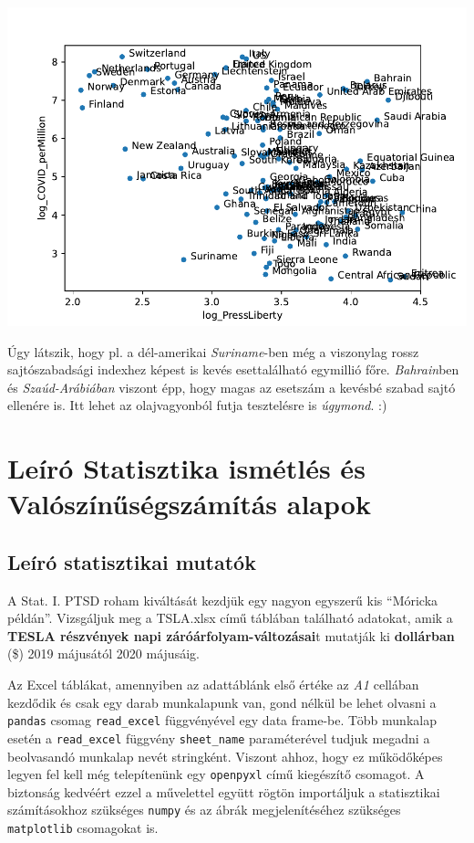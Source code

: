 \documentclass[
]{book}
\begin{document}
\includegraphics{_main_files/figure-latex/unnamed-chunk-143-31.pdf}

Úgy látszik, hogy pl. a dél-amerikai \emph{Suriname}-ben még a viszonylag rossz sajtószabadsági indexhez képest is kevés esettalálható egymillió főre. \emph{Bahrain}ben és \emph{Szaúd-Arábiában} viszont épp, hogy magas az esetszám a kevésbé szabad sajtó ellenére is. Itt lehet az olajvagyonból futja tesztelésre is \emph{úgymond}. :)

\chapter{Leíró Statisztika ismétlés és Valószínűségszámítás alapok}\label{leuxedruxf3-statisztika-ismuxe9tluxe9s-uxe9s-valuxf3szuxednux171suxe9gszuxe1muxedtuxe1s-alapok}

\section{Leíró statisztikai mutatók}\label{leuxedruxf3-statisztikai-mutatuxf3k}

A Stat. I. PTSD roham kiváltását kezdjük egy nagyon egyszerű kis ``Móricka példán''. Vizsgáljuk meg a TSLA.xlsx című táblában található adatokat, amik a \textbf{TESLA részvények napi záróárfolyam-változásai}t mutatják ki \textbf{dollárban} (\$) 2019 májusától 2020 májusáig.

Az Excel táblákat, amennyiben az adattáblánk első értéke az \emph{A1} cellában kezdődik és csak egy darab munkalapunk van, gond nélkül be lehet olvasni a \texttt{pandas} csomag \texttt{read\_excel} függvényével egy data frame-be. Több munkalap esetén a \texttt{read\_excel} függvény \texttt{sheet\_name} paraméterével tudjuk megadni a beolvasandó munkalap nevét stringként. Viszont ahhoz, hogy ez működőképes legyen fel kell még telepítenünk egy \texttt{openpyxl} című kiegészítő csomagot. A biztonság kedvéért ezzel a művelettel együtt rögtön importáljuk a statisztikai számításokhoz szükséges \texttt{numpy} és az ábrák megjelenítéséhez szükséges \texttt{matplotlib} csomagokat is.
\end{document}

